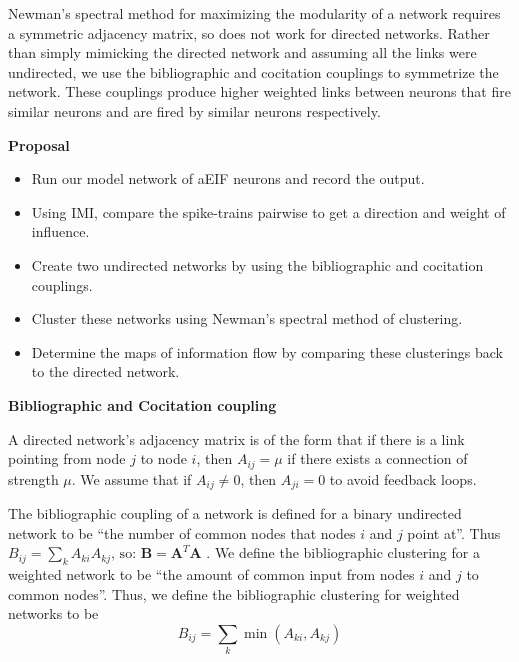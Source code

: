 \documentclass[a0,portrait, 18pt]{a0poster}
\renewcommand{\paragraph}[1]{\vspace{1cm}\par{\Large\bf #1}\par}
\newenvironment{textbox}
{\begin{lrbox}{\dummybox}\begin{minipage}{0.9\columnwidth}}
{\end{minipage}\end{lrbox}\raisebox{-\depth}{\psshadowbox[framesep=1em,framearc=0,shadow=false]{\usebox{\dummybox}}}\vspace{0.005\textheight}}
\begin{document}
\begin{center}
{\begin{textbox}
\vskip 4pt
Newman's spectral method for maximizing the modularity of a network \cite{Newman2006a} requires a symmetric adjacency matrix, so does not work for directed networks.  Rather than simply mimicking the directed network and assuming all the links were undirected, we use the bibliographic and cocitation couplings to symmetrize the network.  These couplings produce higher weighted links between neurons that fire similar neurons and are fired by similar neurons respectively. 
\end{textbox}

\begin{textbox}
\paragraph{Proposal}
\vskip 10pt
\begin{itemize}
\item Run our model network of aEIF neurons and record the output.
\item \vskip 10pt Using IMI, compare the spike-trains pairwise to get a direction and weight of influence.
\item \vskip 10pt Create two undirected networks by using the bibliographic and cocitation couplings.
\item \vskip 10pt Cluster these networks using Newman's spectral method of clustering.
\item \vskip 10pt Determine the maps of information flow by comparing these clusterings back to the directed network.
\end{itemize}
\end{textbox}

\begin{textbox}
\paragraph{Bibliographic and Cocitation coupling} 
\vskip 20pt
A directed network's adjacency matrix is of the form that if there is a link pointing from node $j$ to node $i$, then $A_{ij} = \mu$ if there exists a connection of strength $\mu$.  We assume that if $A_{ij}\neq0$, then $A_{ji}=0$ to avoid feedback loops.

The bibliographic coupling of a network is defined for a binary undirected network to be ``the number of common nodes that nodes $i$ and $j$ point at''.  Thus  $B_{ij} = \sum_{k}A_{ki}A_{kj} \mbox{, so: } \mathbf{B} = \mathbf{A}^T\mathbf{A}$  \cite{NewmanBook}.  We define the bibliographic clustering for a weighted network to be ``the amount of common input from  nodes $i$ and $j$ to common nodes''.  Thus, we define the bibliographic clustering for weighted networks to be 
 $$
 B_{ij} = \sum_{k} \min (A_{ki},A_{kj} )
 $$
 

\end{textbox}}
\end{center}
\end{document}
